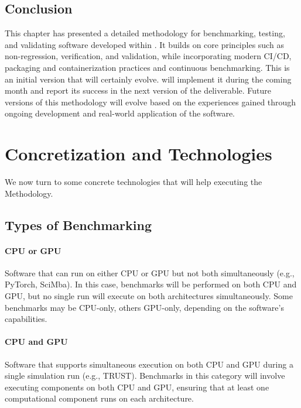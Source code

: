 \subsection{Conclusion}
\label{sec:comprehensive-methodology-conclusion}

This chapter has presented a detailed methodology for benchmarking, testing, and validating software developed within \exama. It builds on core principles such as non-regression, verification, and validation, while incorporating modern CI/CD, packaging and containerization practices and continuous benchmarking. 
This is an initial version that will certainly evolve. 
\exama will implement it during the coming month and report its success in the next version of the deliverable.
Future versions of this methodology will evolve based on the experiences gained through ongoing development and real-world application of the \exama software.

\section{Concretization and Technologies}
\label{sec:benchmark:technologies}

We now turn to some concrete technologies that will help executing the Methodology.

\subsection{Types of Benchmarking}
\label{sec:methodology-types}

\paragraph{CPU or GPU}
Software that can run on either CPU or GPU but not both simultaneously (e.g., PyTorch, SciMba). In this case, benchmarks will be performed on both CPU and GPU, but no single run will execute on both architectures simultaneously. Some benchmarks may be CPU-only, others GPU-only, depending on the software's capabilities.

\paragraph{CPU and GPU}
Software that supports simultaneous execution on both CPU and GPU during a single simulation run (e.g., TRUST). Benchmarks in this category will involve executing components on both CPU and GPU, ensuring that at least one computational component runs on each architecture.

